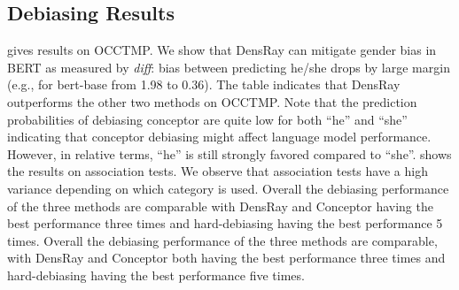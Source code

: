 
\subsection{Debiasing Results}
 gives results on OCCTMP. We show that
DensRay can mitigate gender bias in BERT as measured by
\textit{diff}: bias between predicting he/she drops by large margin
(e.g., for bert-base from 1.98 to 0.36). The table indicates
that DensRay outperforms the other two methods on OCCTMP.
Note that
the prediction probabilities of debiasing conceptor are
quite low for both ``he'' and ``she'' indicating that conceptor debiasing might affect language model performance. However,
in relative terms, ``he'' is still strongly favored compared
to ``she''.
 shows the results on association tests. We observe that association tests have a high variance depending on which category is used. 
Overall the debiasing performance of the three methods are comparable with DensRay and Conceptor having the best performance three times and hard-debiasing having the best performance 5 times.
Overall the debiasing performance of the three methods are comparable, with DensRay and Conceptor both having the best performance three times and hard-debiasing having the best performance five times.

